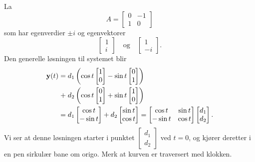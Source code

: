 \begin{ex}
\label{eks_3}
La 
\[
A=
\begin{bmatrix}
0 & -1   \\
1 & 0
\end{bmatrix}
\]
som har egenverdier $\pm i$ og egenvektorer 
\[
\begin{bmatrix}
1  \\
i 
\end{bmatrix}
\quad \text{og} \quad
\begin{bmatrix}
1  \\
-i 
\end{bmatrix}. 
\]
Den generelle løsningen til systemet blir 
\begin{align*}
\mathbf{y}(t)=\;&d_1 \left(\cos t\begin{bmatrix}  1 \\ 0\end{bmatrix}-\sin t\begin{bmatrix} 0 \\ 1\end{bmatrix}\right) 
\\+\;&d_2 \left(\cos t\begin{bmatrix} 0 \\ 1\end{bmatrix}+\sin t\begin{bmatrix}  1 \\ 0\end{bmatrix}\right)\\=\;&d_1\begin{bmatrix} \cos t \\ -\sin t\end{bmatrix}+d_2\begin{bmatrix}  \sin t \\ \cos t\end{bmatrix}=\begin{bmatrix} \cos t & \sin t\\ -\sin t & \cos t\end{bmatrix}\begin{bmatrix} d_1 \\ d_2 \end{bmatrix}.
\end{align*}
Vi ser at denne løsningen starter i punktet $\begin{bmatrix} d_1 \\ d_2 \end{bmatrix}$ ved $t=0$, og kjører deretter i en pen sirkulær bane om origo. 
Merk at kurven er traversert med klokken.
\end{ex}

